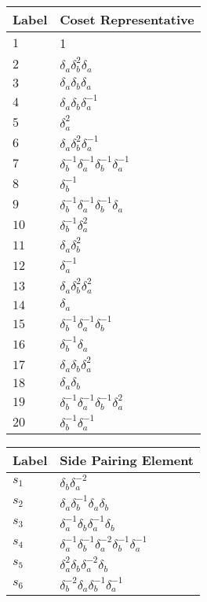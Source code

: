 \documentclass{article}
\begin{document}
\begin{center}
\begin{tabular}{ll}
\toprule
Label & Coset Representative\\
\midrule
$1$ & 1 \\
$2$ & $\delta_a^{}\delta_b^{2}\delta_a^{}$ \\
$3$ & $\delta_a^{}\delta_b^{}\delta_a^{}$ \\
$4$ & $\delta_a^{}\delta_b^{}\delta_a^{-1}$ \\
$5$ & $\delta_a^{2}$ \\
$6$ & $\delta_a^{}\delta_b^{2}\delta_a^{-1}$ \\
$7$ & $\delta_b^{-1}\delta_a^{-1}\delta_b^{-1}\delta_a^{-1}$ \\
$8$ & $\delta_b^{-1}$ \\
$9$ & $\delta_b^{-1}\delta_a^{-1}\delta_b^{-1}\delta_a^{}$ \\
$10$ & $\delta_b^{-1}\delta_a^{2}$ \\
$11$ & $\delta_a^{}\delta_b^{2}$ \\
$12$ & $\delta_a^{-1}$ \\
$13$ & $\delta_a^{}\delta_b^{2}\delta_a^{2}$ \\
$14$ & $\delta_a^{}$ \\
$15$ & $\delta_b^{-1}\delta_a^{-1}\delta_b^{-1}$ \\
$16$ & $\delta_b^{-1}\delta_a^{}$ \\
$17$ & $\delta_a^{}\delta_b^{}\delta_a^{2}$ \\
$18$ & $\delta_a^{}\delta_b^{}$ \\
$19$ & $\delta_b^{-1}\delta_a^{-1}\delta_b^{-1}\delta_a^{2}$ \\
$20$ & $\delta_b^{-1}\delta_a^{-1}$ \\
\bottomrule
\end{tabular}
\hfill
\begin{tabular}{ll}
\toprule
Label & Side Pairing Element\\
\midrule
$s_{1}$ & $\delta_b^{}\delta_a^{-2}$ \\
$s_{2}$ & $\delta_a^{}\delta_b^{-1}\delta_a^{}\delta_b^{}$ \\
$s_{3}$ & $\delta_a^{-1}\delta_b^{}\delta_a^{-1}\delta_b^{}$ \\
$s_{4}$ & $\delta_a^{-1}\delta_b^{-1}\delta_a^{-2}\delta_b^{-1}\delta_a^{-1}$ \\
$s_{5}$ & $\delta_a^{2}\delta_b^{}\delta_a^{-2}\delta_b^{}$ \\
$s_{6}$ & $\delta_b^{-2}\delta_a^{}\delta_b^{-1}\delta_a^{-1}$ \\

\end{tabular}
\end{center}
\end{document}
